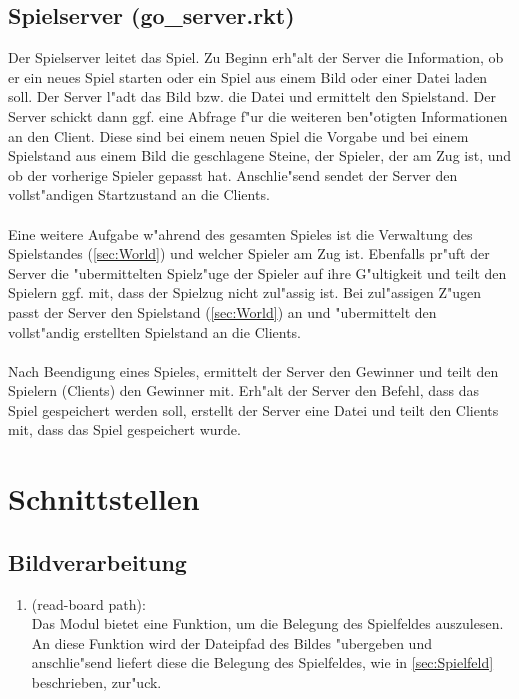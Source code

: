 \documentclass[a4paper]{scrreprt}
\begin{document}
\section{Spielserver (go\_server.rkt)}
Der Spielserver leitet das Spiel. Zu Beginn erh"alt der Server die Information, ob er ein neues Spiel starten oder ein Spiel aus einem Bild oder einer Datei laden soll. Der Server l"adt das Bild bzw. die Datei und ermittelt den Spielstand. Der Server schickt dann ggf. eine Abfrage f"ur die weiteren ben"otigten Informationen an den Client. Diese sind bei einem neuen Spiel die Vorgabe und bei einem Spielstand aus einem Bild die geschlagene Steine, der Spieler, der am Zug ist, und ob der vorherige Spieler gepasst hat. Anschlie"send sendet der Server den vollst"andigen Startzustand an die Clients.\\\\
Eine weitere Aufgabe w"ahrend des gesamten Spieles ist die Verwaltung des Spielstandes (\ref{sec:World}) und welcher Spieler am Zug ist. Ebenfalls pr"uft der Server die "ubermittelten Spielz"uge der Spieler auf ihre G"ultigkeit und teilt den Spielern ggf. mit, dass der Spielzug nicht zul"assig ist. Bei zul"assigen Z"ugen passt der Server den Spielstand (\ref{sec:World}) an und "ubermittelt den vollst"andig erstellten Spielstand an die Clients.\\\\ 
Nach Beendigung eines Spieles, ermittelt der Server den Gewinner und teilt den Spielern (Clients) den Gewinner mit. Erh"alt der Server den Befehl, dass das Spiel gespeichert werden soll, erstellt der Server eine Datei und teilt den Clients mit, dass das Spiel gespeichert wurde.

 \chapter{Schnittstellen}
 \section{Bildverarbeitung}
\begin{enumerate}
\item (read-board path):\\
Das Modul bietet eine Funktion, um die Belegung des Spielfeldes auszulesen. An diese Funktion wird der Dateipfad des Bildes "ubergeben und anschlie"send liefert diese die Belegung des Spielfeldes, wie in \ref{sec:Spielfeld} beschrieben, zur"uck.
\end{enumerate}
\end{document}
